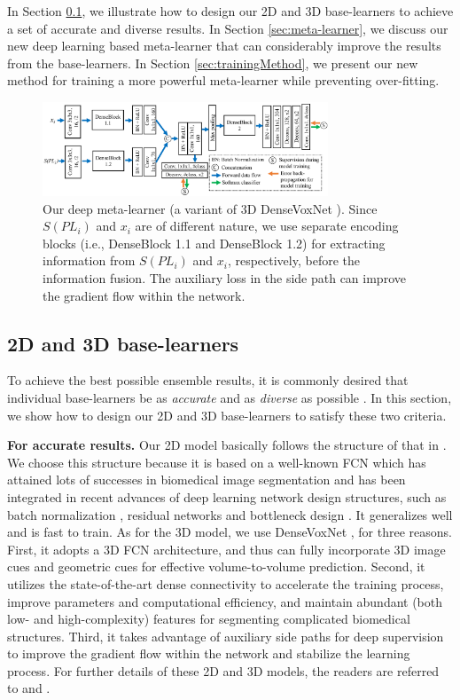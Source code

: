 \documentclass[letterpaper]{article} %
\begin{document}
In Section \ref{sec:constructBL}, we illustrate how to design our 2D and 3D base-learners to achieve a set of accurate and diverse results. In Section \ref{sec:meta-learner}, we discuss our new deep learning based meta-learner that can considerably improve the results from the base-learners. In Section \ref{sec:trainingMethod}, we present our new method for training a more powerful meta-learner while preventing over-fitting.

\begin{figure}[ht]
  \centering
  \includegraphics[width=0.76\textwidth]{deep-meta-learner.pdf}
  \caption{Our deep meta-learner (a variant of 3D DenseVoxNet \cite{yu2017automatic}). Since $S(PL_i)$ and $x_i$ are of different nature, we use separate encoding blocks (i.e., DenseBlock 1.1 and DenseBlock 1.2) for extracting information from $S(PL_i)$ and $x_i$, respectively, before the information fusion. The auxiliary loss in the side path can improve the gradient flow within the network.}
\label{fig:dml}
\end{figure}

\subsection{2D and 3D base-learners}\label{sec:constructBL}
To achieve the best possible ensemble results, it is commonly desired that individual base-learners be as {\em accurate} and as {\em diverse} as possible \cite{zhou2012ensemble}. In this section, we show how to design our 2D and 3D base-learners to satisfy these two criteria.

\textbf{For accurate results.} Our 2D model basically follows the structure of that in \cite{yang2017suggestive}. We choose this structure because it is based on a well-known FCN \cite{chen2016dcan} which has attained lots of successes in biomedical image segmentation and has been integrated in recent advances of deep learning network design structures, such as batch normalization \cite{ioffe2015batch}, residual networks and bottleneck design \cite{he2016deep}. It generalizes well and is fast to train. As for the 3D model, we use DenseVoxNet \cite{yu2017automatic}, for three reasons.  First, it adopts a 3D FCN architecture, and thus can fully incorporate 3D image cues and geometric cues for effective volume-to-volume prediction. Second, it utilizes the state-of-the-art dense connectivity \cite{huang2017densely} to accelerate the training process, improve parameters and computational efficiency, and maintain abundant (both low- and high-complexity) features for segmenting complicated biomedical structures. Third, it takes advantage of auxiliary side paths for deep supervision \cite{dou20163d} to improve the gradient flow within the network and stabilize the learning process. For further details of these 2D and 3D models, the readers are referred to \cite{yang2017suggestive} and \cite{yu2017automatic}.
\end{document}
